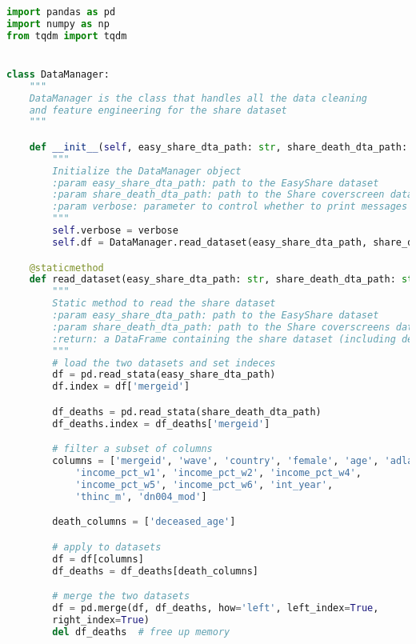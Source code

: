 







\begin{lstlisting}[language=Python]
import pandas as pd
import numpy as np
from tqdm import tqdm


class DataManager:
    """
    DataManager is the class that handles all the data cleaning
    and feature engineering for the share dataset
    """

    def __init__(self, easy_share_dta_path: str, share_death_dta_path: str, verbose: str = True) -> None:
        """
        Initialize the DataManager object
        :param easy_share_dta_path: path to the EasyShare dataset
        :param share_death_dta_path: path to the Share coverscreen dataset
        :param verbose: parameter to control whether to print messages
        """
        self.verbose = verbose
        self.df = DataManager.read_dataset(easy_share_dta_path, share_death_dta_path)

    @staticmethod
    def read_dataset(easy_share_dta_path: str, share_death_dta_path: str) -> pd.DataFrame:
        """
        Static method to read the share dataset
        :param easy_share_dta_path: path to the EasyShare dataset
        :param share_death_dta_path: path to the Share coverscreens dataset
        :return: a DataFrame containing the share dataset (including deaths from the cover screens)
        """
        # load the two datasets and set indeces
        df = pd.read_stata(easy_share_dta_path)
        df.index = df['mergeid']

        df_deaths = pd.read_stata(share_death_dta_path)
        df_deaths.index = df_deaths['mergeid']

        # filter a subset of columns
        columns = ['mergeid', 'wave', 'country', 'female', 'age', 'adla', 
            'income_pct_w1', 'income_pct_w2', 'income_pct_w4', 
            'income_pct_w5', 'income_pct_w6', 'int_year', 
            'thinc_m', 'dn004_mod']

        death_columns = ['deceased_age']

        # apply to datasets
        df = df[columns]
        df_deaths = df_deaths[death_columns]

        # merge the two datasets
        df = pd.merge(df, df_deaths, how='left', left_index=True, 
        right_index=True)
        del df_deaths  # free up memory


\end{lstlisting}
